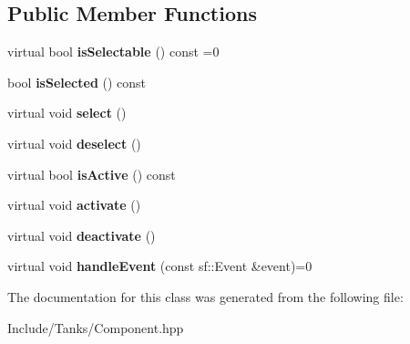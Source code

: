 \subsection*{Public Member Functions}
\begin{DoxyCompactItemize}
\item 
\hypertarget{class_g_u_i_1_1_component_a44d14506c9a1dbc839e05a6bf99c341b}{}virtual bool {\bfseries is\+Selectable} () const =0\label{class_g_u_i_1_1_component_a44d14506c9a1dbc839e05a6bf99c341b}

\item 
\hypertarget{class_g_u_i_1_1_component_affb93ae274f3dd3f44da70520d13b07d}{}bool {\bfseries is\+Selected} () const \label{class_g_u_i_1_1_component_affb93ae274f3dd3f44da70520d13b07d}

\item 
\hypertarget{class_g_u_i_1_1_component_ae807056061554da9c0e99b380eb9e480}{}virtual void {\bfseries select} ()\label{class_g_u_i_1_1_component_ae807056061554da9c0e99b380eb9e480}

\item 
\hypertarget{class_g_u_i_1_1_component_acd7bf93ec3553fdbdfadc8402ee967df}{}virtual void {\bfseries deselect} ()\label{class_g_u_i_1_1_component_acd7bf93ec3553fdbdfadc8402ee967df}

\item 
\hypertarget{class_g_u_i_1_1_component_a7b750c7c3f9b9910ac775b969116e001}{}virtual bool {\bfseries is\+Active} () const \label{class_g_u_i_1_1_component_a7b750c7c3f9b9910ac775b969116e001}

\item 
\hypertarget{class_g_u_i_1_1_component_a6c2bfb067dc3bfa9dc833cd3e6cba807}{}virtual void {\bfseries activate} ()\label{class_g_u_i_1_1_component_a6c2bfb067dc3bfa9dc833cd3e6cba807}

\item 
\hypertarget{class_g_u_i_1_1_component_adca7b246109fa739ebcd608637746364}{}virtual void {\bfseries deactivate} ()\label{class_g_u_i_1_1_component_adca7b246109fa739ebcd608637746364}

\item 
\hypertarget{class_g_u_i_1_1_component_aacf5e981e7b5726f5c7e9436455660ba}{}virtual void {\bfseries handle\+Event} (const sf\+::\+Event \&event)=0\label{class_g_u_i_1_1_component_aacf5e981e7b5726f5c7e9436455660ba}

\end{DoxyCompactItemize}


The documentation for this class was generated from the following file\+:\begin{DoxyCompactItemize}
\item 
Include/\+Tanks/Component.\+hpp\end{DoxyCompactItemize}
